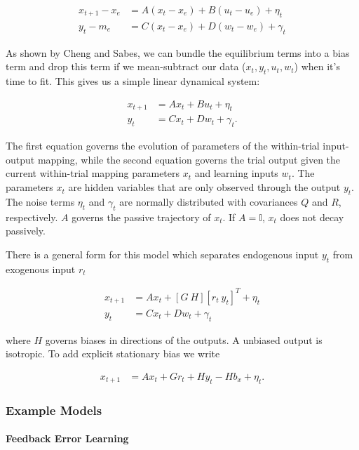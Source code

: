 \[
\begin{aligned}
x_{t+1} - x_e &= A(x_t-x_e) + B(u_t-u_e) + \eta_t \\
y_t - m_e &= C(x_t-x_e) + D(w_t-w_e) + \gamma_t
\end{aligned}
\]

As shown by Cheng and Sabes, we can bundle the equilibrium terms into a
bias term and drop this term if we mean-subtract our data
(\(x_t, y_t, u_t, w_t\)) when it's time to fit. This gives us a simple
linear dynamical system:

\[
\begin{aligned}
x_{t+1} &= Ax_t + Bu_t + \eta_t \\
y_t &= Cx_t + Dw_t + \gamma_t.
\end{aligned}
\]

The first equation governs the evolution of parameters of the
within-trial input-output mapping, while the second equation governs the
trial output given the current within-trial mapping parameters \(x_t\)
and learning inputs \(w_t\). The parameters \(x_t\) are hidden variables
that are only observed through the output \(y_t\). The noise terms
\(\eta_t\) and \(\gamma_t\) are normally distributed with covariances
\(Q\) and \(R\), respectively. \(A\) governs the passive trajectory of
\(x_t\). If \(A=\mathbb{I}\), \(x_t\) does not decay passively.

There is a general form for this model which separates endogenous input
\(y_t\) from exogenous input \(r_t\)

\[
\begin{aligned}
x_{t+1} &= Ax_t + [G \ H][r_t \ y_t]^T + \eta_t \\
y_t &= Cx_t + Dw_t + \gamma_t
\end{aligned}
\]

where \(H\) governs biases in directions of the outputs. A unbiased
output is isotropic. To add explicit stationary bias we write

\[
\begin{aligned}
x_{t+1} &= Ax_t + Gr_t + Hy_t - Hb_x + \eta_t.
\end{aligned}
\]

\subsubsection{Example Models}\label{example-models}

\paragraph{Feedback Error Learning}\label{feedback-error-learning}

